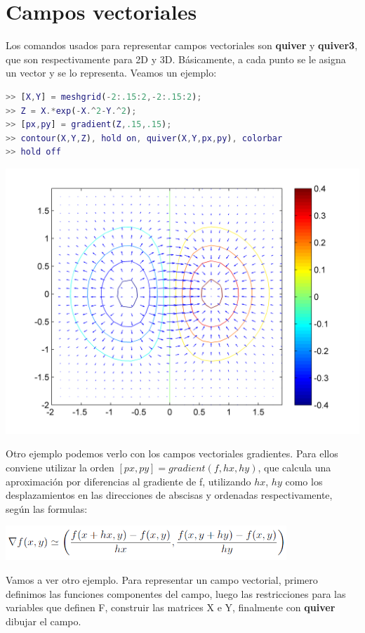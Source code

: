 \chapter{Campos vectoriales}

Los comandos usados para representar campos vectoriales son \textbf{quiver} y \textbf{quiver3}, que son respectivamente para 2D y 3D. Básicamente, a cada punto se le asigna un vector y se lo representa. Veamos un ejemplo:

\begin{lstlisting}[language=Matlab]
>> [X,Y] = meshgrid(-2:.15:2,-2:.15:2);
>> Z = X.*exp(-X.^2-Y.^2);
>> [px,py] = gradient(Z,.15,.15);
>> contour(X,Y,Z), hold on, quiver(X,Y,px,py), colorbar
>> hold off
\end{lstlisting}

\includegraphics[width=400pt]{./Imagenes/cvector1.png}

Otro ejemplo podemos verlo con los campos vectoriales gradientes. Para ellos conviene utilizar la orden $[px,py]=gradient(f,hx,hy)$, que calcula una aproximación por diferencias al gradiente de f, utilizando $hx$, $hy$ como los desplazamientos en las direcciones de abscisas y ordenadas respectivamente, según las formulas:
\begin{center}
\includegraphics[width=300pt]{./Imagenes/grad.png}
\end{center}

Vamos a ver otro ejemplo. Para representar un campo vectorial, primero definimos las funciones componentes del campo, luego las restricciones para las variables que definen F, construir las matrices X e Y, finalmente con \textbf{quiver} dibujar el campo.

